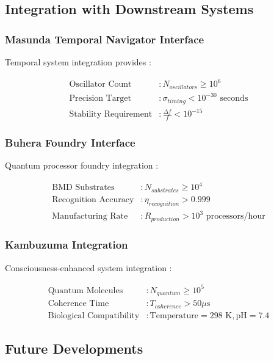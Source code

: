 \subsection{Integration with Downstream Systems}

\subsubsection{Masunda Temporal Navigator Interface}

Temporal system integration provides \cite{sachikonye2024buhera}:

\begin{align}
\text{Oscillator Count} &: N_{oscillators} \geq 10^6 \\
\text{Precision Target} &: \sigma_{timing} < 10^{-30} \text{ seconds} \\
\text{Stability Requirement} &: \frac{\Delta f}{f} < 10^{-15}
\end{align}

\subsubsection{Buhera Foundry Interface}

Quantum processor foundry integration \cite{lloyd2000ultimate}:

\begin{align}
\text{BMD Substrates} &: N_{substrates} \geq 10^4 \\
\text{Recognition Accuracy} &: \eta_{recognition} > 0.999 \\
\text{Manufacturing Rate} &: R_{production} > 10^3 \text{ processors/hour}
\end{align}

\subsubsection{Kambuzuma Integration}

Consciousness-enhanced system integration \cite{tegmark2017life}:

\begin{align}
\text{Quantum Molecules} &: N_{quantum} \geq 10^5 \\
\text{Coherence Time} &: T_{coherence} > 50 \mu\text{s} \\
\text{Biological Compatibility} &: \text{Temperature} = 298 \text{ K}, \text{pH} = 7.4
\end{align}

\subsection{Future Developments}

